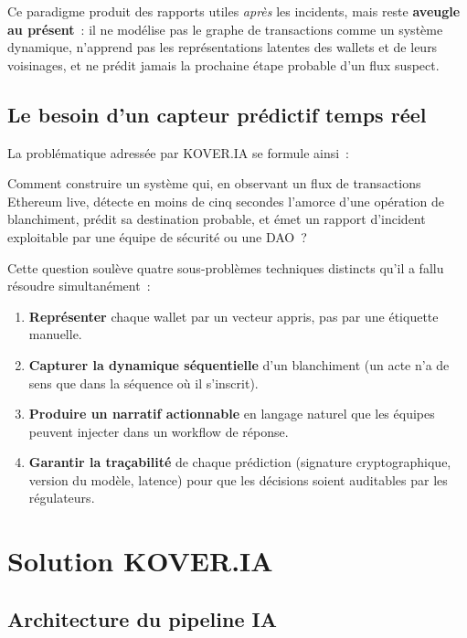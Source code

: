 \documentclass[11pt,a4paper]{article}
\begin{document}
Ce paradigme produit des rapports utiles \emph{après} les incidents,
mais reste \textbf{aveugle au présent}~: il ne modélise pas le graphe
de transactions comme un système dynamique, n'apprend pas les
représentations latentes des wallets et de leurs voisinages, et ne
prédit jamais la prochaine étape probable d'un flux suspect.

\subsection{Le besoin d'un capteur prédictif temps réel}

La problématique adressée par \textsc{KOVER.IA} se formule ainsi~:

\begin{quote_kv}
Comment construire un système qui, en observant un flux de transactions
Ethereum live, détecte en moins de cinq secondes l'amorce d'une
opération de blanchiment, prédit sa destination probable, et émet un
rapport d'incident exploitable par une équipe de sécurité ou une DAO~?
\end{quote_kv}

Cette question soulève quatre sous-problèmes techniques distincts qu'il
a fallu résoudre simultanément~:

\begin{enumerate}
  \item \textbf{Représenter} chaque wallet par un vecteur appris,
        pas par une étiquette manuelle.
  \item \textbf{Capturer la dynamique séquentielle} d'un blanchiment
        (un acte n'a de sens que dans la séquence où il s'inscrit).
  \item \textbf{Produire un narratif actionnable} en langage naturel
        que les équipes peuvent injecter dans un workflow de réponse.
  \item \textbf{Garantir la traçabilité} de chaque prédiction (signature
        cryptographique, version du modèle, latence) pour que les
        décisions soient auditables par les régulateurs.
\end{enumerate}

\section{Solution KOVER.IA}

\subsection{Architecture du pipeline IA}
\end{document}
